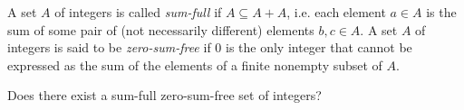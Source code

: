 A set $A$ of integers is called \emph{sum-full} if $A\subseteq A+A$, i.e. each element $a\in A$ is the sum of some pair of (not necessarily different) elements $b,c\in A$. A set $A$ of integers is said to be \emph{zero-sum-free} if $0$ is the only integer that cannot be expressed as the sum of the elements of a finite nonempty subset of $A$.

Does there exist a sum-full zero-sum-free set of integers?